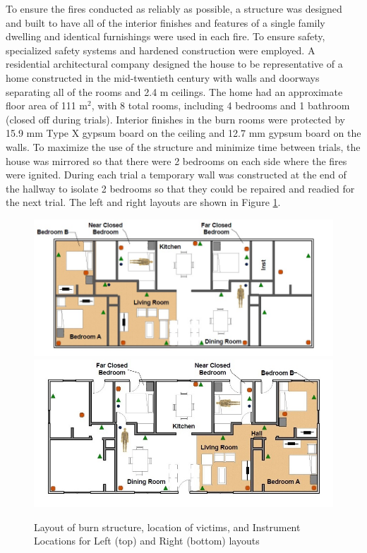 \documentclass[12pt,oneside]{article}
\begin{document}
To ensure the fires conducted as reliably as possible, a structure was designed and built to have all of the interior finishes and features of a single family dwelling and identical furnishings were used in each fire. To ensure safety,  specialized safety systems and hardened construction were employed. A residential architectural company designed the house to be representative of a home constructed in the mid-twentieth century with walls and doorways separating all of the rooms and 2.4 m ceilings. The home had an approximate floor area of 111 m$^2$, with 8 total rooms, including 4 bedrooms and 1 bathroom (closed off during trials). Interior finishes in the burn rooms were protected by 15.9 mm Type X gypsum board on the ceiling and 12.7 mm gypsum board on the walls. To maximize the use of the structure and minimize time between trials, the house was mirrored so that there were 2 bedrooms on each side where the fires were ignited.  During each trial a temporary wall was constructed at the end of the hallway to isolate 2 bedrooms so that they could be repaired and readied for the next trial. The left and right layouts are shown in Figure \ref{fig:layout}.
\begin{figure}[!ht]
	\centering
	\includegraphics[width=.75\textwidth]{../Images/Left}
	\includegraphics[width=.75\textwidth]{../Images/Right}
	\caption[Structure Layout and Instrument Locations]{Layout of burn structure, location of victims, and Instrument Locations for Left (top) and Right (bottom) layouts}
	\label{fig:layout}
\end{figure}
\end{document}
